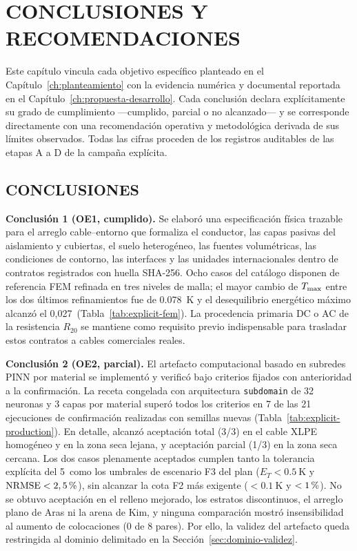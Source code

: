 \chapter{CONCLUSIONES Y RECOMENDACIONES}
\label{ch:conclusiones}
\thispagestyle{empty}

Este capítulo vincula cada objetivo específico planteado en el Capítulo~\ref{ch:planteamiento} con la evidencia numérica y documental reportada en el Capítulo~\ref{ch:propuesta-desarrollo}. Cada conclusión declara explícitamente su grado de cumplimiento —cumplido, parcial o no alcanzado— y se corresponde directamente con una recomendación operativa y metodológica derivada de sus límites observados. Todas las cifras proceden de los registros auditables de las etapas A a D de la campaña explícita.

\section{CONCLUSIONES}

\textbf{Conclusión 1 (OE1, cumplido).} Se elaboró una especificación física trazable para el arreglo cable--entorno que formaliza el conductor, las capas pasivas del aislamiento y cubiertas, el suelo heterogéneo, las fuentes volumétricas, las condiciones de contorno, las interfaces y las unidades internacionales dentro de contratos registrados con huella SHA-256. Ocho casos del catálogo disponen de referencia FEM refinada en tres niveles de malla; el mayor cambio de $T_{\max}$ entre los dos últimos refinamientos fue de \SI{0,078}{\kelvin} y el desequilibrio energético máximo alcanzó el 0,027\,\pct{} (Tabla~\ref{tab:explicit-fem}). La procedencia primaria DC o AC de la resistencia $R_{20}$ se mantiene como requisito previo indispensable para trasladar estos contratos a cables comerciales reales.

\textbf{Conclusión 2 (OE2, parcial).} El artefacto computacional basado en subredes PINN por material se implementó y verificó bajo criterios fijados con anterioridad a la confirmación. La receta congelada con arquitectura \texttt{subdomain} de 32 neuronas y 3 capas por material superó todos los criterios en 7 de las 21 ejecuciones de confirmación realizadas con semillas nuevas (Tabla~\ref{tab:explicit-production}). En detalle, alcanzó aceptación total (3/3) en el cable XLPE homogéneo y en la zona seca lejana, y aceptación parcial (1/3) en la zona seca cercana. Los dos casos plenamente aceptados cumplen tanto la tolerancia explícita del 5\,\pct{} como los umbrales de escenario F3 del plan ($E_T<\SI{0,5}{\kelvin}$ y $\mathrm{NRMSE}<2,5\,\pct{}$), sin alcanzar la cota F2 más exigente ($<\SI{0,1}{\kelvin}$ y $<1\,\pct{}$). No se obtuvo aceptación en el relleno mejorado, los estratos discontinuos, el arreglo plano de Aras ni la arena de Kim, y ninguna comparación mostró insensibilidad al aumento de colocaciones (0 de 8 pares). Por ello, la validez del artefacto queda restringida al dominio delimitado en la Sección~\ref{sec:dominio-validez}.

